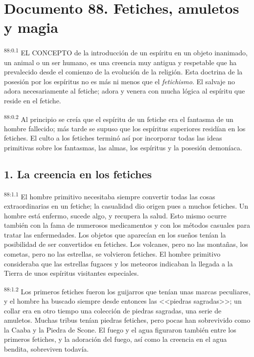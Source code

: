\chapter{Documento 88. Fetiches, amuletos y magia}
\par
\textsuperscript{88:0.1} EL CONCEPTO de la introducción de un espíritu en un objeto inanimado, un animal o un ser humano, es una creencia muy antigua y respetable que ha prevalecido desde el comienzo de la evolución de la religión. Esta doctrina de la posesión por los espíritus no es más ni menos que el \textit{fetichismo}. El salvaje no adora necesariamente al fetiche; adora y venera con mucha lógica al espíritu que reside en el fetiche.

\par
\textsuperscript{88:0.2} Al principio se creía que el espíritu de un fetiche era el fantasma de un hombre fallecido; más tarde se supuso que los espíritus superiores residían en los fetiches. El culto a los fetiches terminó así por incorporar todas las ideas primitivas sobre los fantasmas, las almas, los espíritus y la posesión demoníaca.

\section*{1. La creencia en los fetiches}
\par
\textsuperscript{88:1.1} El hombre primitivo necesitaba siempre convertir todas las cosas extraordinarias en un fetiche; la casualidad dio origen pues a muchos fetiches. Un hombre está enfermo, sucede algo, y recupera la salud. Esto mismo ocurre también con la fama de numerosos medicamentos y con los métodos casuales para tratar las enfermedades. Los objetos que aparecían en los sueños tenían la posibilidad de ser convertidos en fetiches. Los volcanes, pero no las montañas, los cometas, pero no las estrellas, se volvieron fetiches. El hombre primitivo consideraba que las estrellas fugaces y los meteoros indicaban la llegada a la Tierra de unos espíritus visitantes especiales.

\par
\textsuperscript{88:1.2} Los primeros fetiches fueron los guijarros que tenían unas marcas peculiares, y el hombre ha buscado siempre desde entonces las <<piedras sagradas>>; un collar era en otro tiempo una colección de piedras sagradas, una serie de amuletos. Muchas tribus tenían piedras fetiches, pero pocas han sobrevivido como la Caaba y la Piedra de Scone. El fuego y el agua figuraron también entre los primeros fetiches, y la adoración del fuego, así como la creencia en el agua bendita, sobreviven todavía.

